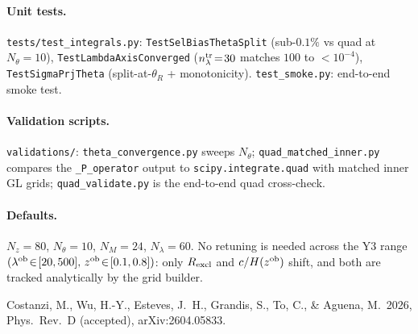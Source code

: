 \documentclass[a4paper, 11pt]{article}
\newcommand{\lob}{\lambda^{\rm ob}}
\newcommand{\ltr}{\lambda^{\rm tr}}
\newcommand{\zob}{z^{\rm ob}}
\begin{document}
\paragraph{Unit tests.} \texttt{tests/test\_integrals.py}:
\texttt{TestSelBiasThetaSplit} (sub-\(0.1\%\) vs quad at
\(N_\theta\!=\!10\)), \texttt{TestLambdaAxisConverged} (\(n_\ltr\!=\!30\)
matches \(100\) to \(<\!10^{-4}\)), \texttt{TestSigmaPrjTheta}
(split-at-\(\theta_R\) + monotonicity). \texttt{test\_smoke.py}:
end-to-end smoke test.

\paragraph{Validation scripts.} \texttt{validations/}:
\texttt{theta\_convergence.py} sweeps \(N_\theta\);
\texttt{quad\_matched\_inner.py} compares the
\texttt{\_P\_operator} output to \texttt{scipy.integrate.quad}
with matched inner GL grids;
\texttt{quad\_validate.py} is the end-to-end quad cross-check.

\paragraph{Defaults.} \(N_z\!=\!80\), \(N_\theta\!=\!10\),
\(N_M\!=\!24\), \(N_\lambda\!=\!60\). No retuning is needed across
the Y3 range \((\lob\!\in\![20,500],\,\zob\!\in\![0.1,0.8])\):
only \(R_{\rm excl}\) and \(c/H(\zob)\) shift, and both are tracked
analytically by the grid builder.


\begin{thebibliography}{}
Costanzi, M., Wu, H.-Y., Esteves, J.~H., Grandis, S., To, C., \&
Aguena, M.\ 2026, Phys.~Rev.~D (accepted), arXiv:2604.05833.
\end{thebibliography}
\end{document}
